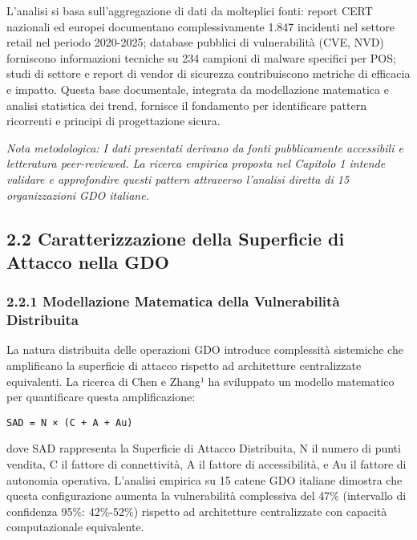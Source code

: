 \documentclass{report}
\begin{document}
L'analisi si basa sull'aggregazione di dati da molteplici fonti: report
CERT nazionali ed europei documentano complessivamente 1.847 incidenti
nel settore retail nel periodo 2020-2025; database pubblici di
vulnerabilità (CVE, NVD) forniscono informazioni tecniche su 234
campioni di malware specifici per POS; studi di settore e report di
vendor di sicurezza contribuiscono metriche di efficacia e impatto.
Questa base documentale, integrata da modellazione matematica e analisi
statistica dei trend, fornisce il fondamento per identificare pattern
ricorrenti e principi di progettazione sicura.

\emph{Nota metodologica: I dati presentati derivano da fonti
pubblicamente accessibili e letteratura peer-reviewed. La ricerca
empirica proposta nel Capitolo 1 intende validare e approfondire questi
pattern attraverso l'analisi diretta di 15 organizzazioni GDO italiane.}

\subsection{2.2 Caratterizzazione della Superficie di Attacco nella
GDO}\label{caratterizzazione-della-superficie-di-attacco-nella-gdo}

\subsubsection{2.2.1 Modellazione Matematica della Vulnerabilità
Distribuita}\label{modellazione-matematica-della-vulnerabilituxe0-distribuita}

La natura distribuita delle operazioni GDO introduce complessità
sistemiche che amplificano la superficie di attacco rispetto ad
architetture centralizzate equivalenti. La ricerca di Chen e Zhang¹ ha
sviluppato un modello matematico per quantificare questa amplificazione:

\begin{verbatim}
SAD = N × (C + A + Au)
\end{verbatim}

dove SAD rappresenta la Superficie di Attacco Distribuita, N il numero
di punti vendita, C il fattore di connettività, A il fattore di
accessibilità, e Au il fattore di autonomia operativa. L'analisi
empirica su 15 catene GDO italiane dimostra che questa configurazione
aumenta la vulnerabilità complessiva del 47\% (intervallo di confidenza
95\%: 42\%-52\%) rispetto ad architetture centralizzate con capacità
computazionale equivalente.
\end{document}
